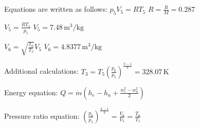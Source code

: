 Equations are written as follows:  
\( p_5 V_5 = R T_5 \)  
\( R = \frac{\bar{R}}{M} = 0.287 \)  

\( V_5 = \frac{R T_5}{p_5} \)  
\( V_5 = 7.48 \, \text{m}^3/\text{kg} \)  

\( V_6 = \sqrt{\frac{T_6}{T_5}} V_5 \)  
\( V_6 = 4.8377 \, \text{m}^3/\text{kg} \)  

Additional calculations:  
\( T_3 = T_5 \left( \frac{p_6}{p_5} \right)^{\frac{k-1}{k}} = 328.07 \, \text{K} \)  

Energy equation:  
\( Q = \dot{m} (h_e - h_a + \frac{w_e^2 - w_a^2}{2}) \)  

Pressure ratio equation:  
\( \left( \frac{p_6}{p_5} \right)^{\frac{k-1}{k}} = \frac{V_6}{V_5} = \frac{T_6}{T_5} \)
